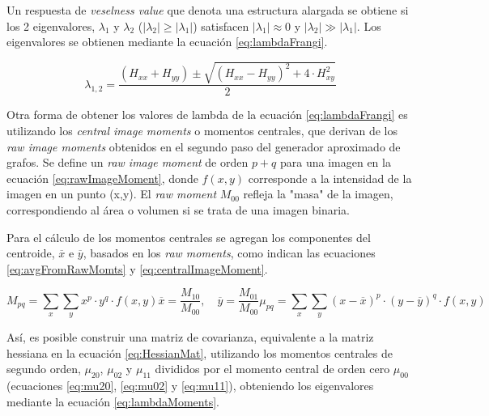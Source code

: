 Un respuesta de {\it veselness value} que denota una estructura alargada se obtiene si los 2 eigenvalores, $\lambda_1$ y $\lambda_2$ ($|\lambda_2| \geq |\lambda_1|$) satisfacen $|\lambda_1| \approx 0 $ y $|\lambda_2| \gg |\lambda_1|$. Los eigenvalores se obtienen mediante la ecuaci\'on \ref{eq:lambdaFrangi}.

\begin{equation}
    \label{eq:lambdaFrangi}
    \lambda_{1,2} = \dfrac{(H_{xx} + H_{yy}) \pm \sqrt{(H_{xx} - H_{yy})^{2} + 4\cdot H_{xy}^{2}     } }{2}
\end{equation}

Otra forma de obtener los valores de lambda de la ecuaci\'on \ref{eq:lambdaFrangi} es utilizando los {\it central image moments} o momentos centrales, que derivan de los {\it raw image moments} obtenidos en el segundo paso del generador aproximado de grafos. Se define un {\it raw image moment} de orden $p+q$ para una imagen en la ecuaci\'on \eqref{eq:rawImageMoment}, donde $f(x,y)$ corresponde a la intensidad de la imagen en un punto (x,y). El {\it raw moment} $M_{00}$ refleja la "masa" de la imagen, correspondiendo al \'area o volumen si se trata de una imagen binaria. 

Para el c\'alculo de los momentos centrales se agregan los componentes del centroide, $\overline{x}$ e $\overline{y}$, basados en los {\it raw moments}, como indican las ecuaciones \eqref{eq:avgFromRawMomts} y \eqref{eq:centralImageMoment}.

\begin{subequations}
\begin{equation}
    \label{eq:rawImageMoment}
    M_{pq} = \sum\limits_{x} \sum\limits_{y} x^p \cdot y^q \cdot f(x,y)
\end{equation}
\begin{equation}
    \label{eq:avgFromRawMomts}
    \overline{x} = \frac{M_{10}}{M_{00}}, \quad
    \overline{y} = \frac{M_{01}}{M_{00}}
\end{equation}
\begin{equation}
    \label{eq:centralImageMoment}
    \mu_{pq} = \sum\limits_{x} \sum\limits_{y} (x - \overline{x})^{p} \cdot (y - \overline{y})^{q} \cdot f(x,y)
\end{equation}
\end{subequations}

As\'i, es posible construir una matriz de covarianza, equivalente a la matriz hessiana en la ecuaci\'on \eqref{eq:HessianMat}, utilizando los momentos centrales de segundo orden, $\mu_{20}$, $\mu_{02}$ y $\mu_{11}$ divididos por el momento central de orden cero $\mu_{00}$ (ecuaciones \eqref{eq:mu20}, \eqref{eq:mu02} y \eqref{eq:mu11}), obteniendo los eigenvalores mediante la ecuaci\'on \eqref{eq:lambdaMoments}.

